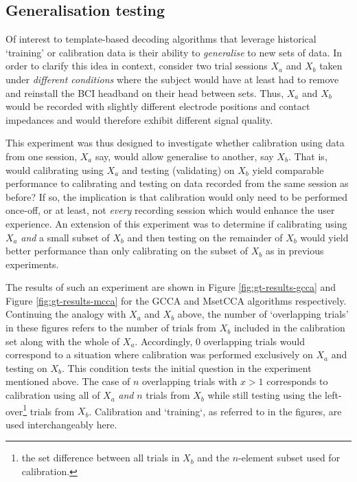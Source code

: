\subsection{Generalisation testing}
\label{subsection:generalisation-testing}
Of interest to template-based decoding algorithms that leverage historical `training' or calibration data is their ability to \textit{generalise} to new sets of data. In order to clarify this idea in context, consider two trial sessions $X_a$ and $X_b$ taken under \textit{different conditions} where the subject would have at least had to remove and reinstall the BCI headband on their head between sets. Thus, $X_a$ and $X_b$ would be recorded with slightly different electrode positions and contact impedances and would therefore exhibit different signal quality. 

This experiment was thus designed to investigate whether calibration using data from one session, $X_a$ say, would allow generalise to another, say $X_b$. That is, would calibrating using $X_a$ and testing (validating) on $X_b$ yield comparable performance to calibrating and testing on data recorded from the same session as before? If so, the implication is that calibration would only need to be performed once-off, or at least, not \textit{every} recording session which would enhance the user experience. An extension of this experiment was to determine if calibrating using $X_a$ \textit{and} a small subset of $X_b$ and then testing on the remainder of $X_b$ would yield better performance than only calibrating on the subset of $X_b$ as in previous experiments.

The results of such an experiment are shown in Figure \ref{fig:gt-results-gcca} and Figure \ref{fig:gt-results-mcca} for the GCCA and MsetCCA algorithms respectively. Continuing the analogy with $X_a$ and $X_b$ above, the number of `overlapping trials' in these figures refers to the number of trials from $X_b$ included in the calibration set along with the whole of $X_a$. Accordingly, 0 overlapping trials would correspond to a situation where calibration was performed exclusively on $X_a$ and testing on $X_b$. This condition tests the initial question in the experiment mentioned above. The case of $n$ overlapping trials with $x>1$ corresponds to calibration using all of $X_a$ \textit{and} $n$ trials from $X_b$ while still testing using the left-over\footnote{the set difference between all trials in $X_b$ and the $n$-element subset used for calibration.} trials from $X_b$. Calibration and `training`, as referred to in the figures, are used interchangeably here.

